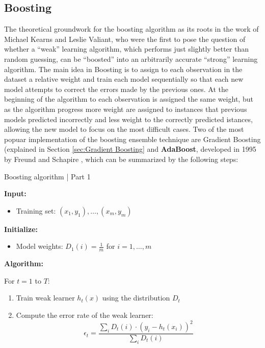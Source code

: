 \subsection{Boosting}
The theoretical groundwork for the boosting algorithm as its roots in the work of Michael Kearns and Leslie Valiant, who were the first to pose the question of whether a “weak” learning algorithm, which performs just slightly better than random guessing, can be “boosted” into an arbitrarily accurate “strong” learning algorithm. The main idea in Boosting is to assign to each observation in the dataset a relative weight and train each model sequentially so that each new model attempts to correct the errors made by the previous ones. At the beginning of the algorithm to each observation is assigned the same weight, but as the algorithm progress more weight are assigned to instances that previous models predicted incorrectly and less weight to the correctly predicted istances, allowing the new model to focus on the most difficult cases. Two of the most popuar implementation of the boosting ensemble technique are Gradient Boosting (explained in Section \ref{sec:Gradient Boosting} and \textbf{AdaBoost}, developed in 1995 by Freund and Schapire \cite{freund1997desicion}, which can be summarized by the following steps:
\begin{tcolorbox}[colback=blue!5, colframe=blue!80, boxrule=0pt]
    \begin{algorithm} [H]
        \caption{Boosting algorithm | Part 1}
        \label{alg:Boosting algorithm}
        \textbf{Input:}
        \begin{itemize}
            \item Training set: ${(x_1, y_1),\dots,(x_m, y_m)}$
        \end{itemize}
        \textbf{Initialize:}
        \begin{itemize}
            \item Model weights: $D_1(i)= \frac{1}{m}$ for $i=1, \dots, m$
        \end{itemize}
        \textbf{Algorithm:}
        
        For $t = 1$ to $T$:
        \begin{enumerate}
             \item Train weak learner $h_t(x)$ using the distribution $D_t$
            \item Compute the error rate of the weak learner: 
            \[
            \epsilon_t = \frac{\sum_{i} D_t(i) \cdot (y_i - h_t(x_i))^2}{\sum_{i} D_t(i)}
            \]
            \end{enumerate}
    \end{algorithm}
\end{tcolorbox}


